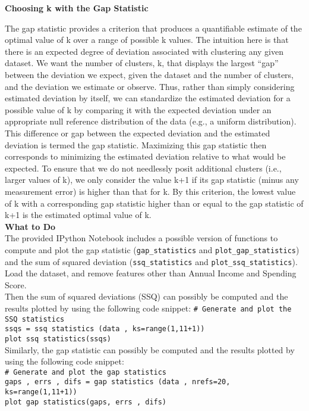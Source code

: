 \documentclass[letter-paper,12pt]{article} %
\begin{document}
\textbf{Choosing k with the Gap Statistic}

The gap statistic provides a criterion that produces a quantifiable estimate of the optimal value of k over a range of possible k values. The intuition here is that there is an expected degree of deviation associated with clustering any given dataset. We want the number of clusters, k, that displays the largest “gap” between the deviation we expect, given the dataset and the number of clusters, and the deviation we estimate or observe. Thus, rather than simply considering estimated deviation by itself, we can standardize the estimated deviation for a possible value of k by comparing it with the expected deviation under an appropriate null reference distribution of the data (e.g., a uniform distribution). This difference or gap between the expected deviation and the estimated deviation is termed the gap statistic. Maximizing this gap statistic then corresponds to minimizing the estimated deviation relative to what would be expected. To ensure that we do not needlessly posit additional clusters (i.e., larger values of k), we only consider the value k+1 if its gap statistic (minus any measurement error) is higher than that for k. By this criterion, the lowest value of k with a corresponding gap statistic higher than or equal to the gap statistic of k+1 is the estimated optimal value of k.\\

\textbf{What to Do}\\
The provided  IPython Notebook includes a possible version of functions to compute and plot the gap statistic (\texttt{gap\_statistics} and \texttt{plot\_gap\_statistics}) and the sum of squared deviation (\texttt{ssq\_statistics} and \texttt{plot\_ssq\_statistics}).\\

Load the dataset, and remove features other than Annual Income and Spending Score.\\

Then the sum of squared deviations (SSQ) can possibly be computed and the results plotted by using the following code snippet:
\texttt{\# Generate and plot the SSQ statistics\\
ssqs = ssq statistics (data , ks=range(1,11+1))\\
plot ssq statistics(ssqs)
}\\

Similarly, the gap statistic can possibly be computed  and the results plotted by using the following code snippet:\\
\texttt{\# Generate and plot the gap statistics\\
gaps , errs , difs = gap statistics (data , nrefs=20, ks=range(1,11+1))\\
plot gap statistics(gaps, errs , difs)
}\\
\end{document}
